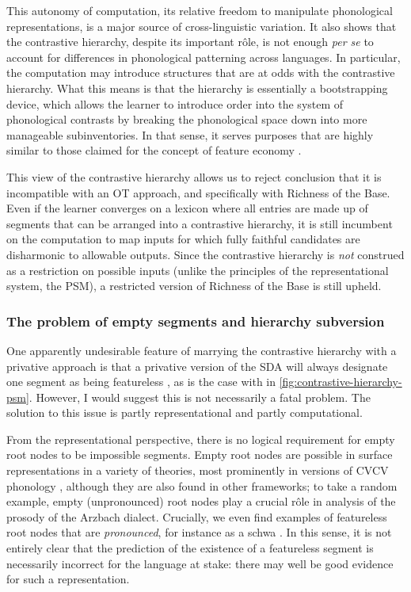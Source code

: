 This autonomy of computation, \ie its relative freedom to manipulate phonological representations, is a major source of cross\hyp linguistic variation. It also shows that the contrastive hierarchy, despite its important rôle, is not enough \emph{per se} to account for differences in phonological patterning across languages. In particular, the computation may introduce structures that are at odds with the contrastive hierarchy. What this means is that the hierarchy is essentially a bootstrapping device, which allows the learner to introduce order into the system of phonological contrasts by breaking the phonological space down into more manageable subinventories. In that sense, it serves purposes that are highly similar to those claimed for the concept of feature economy \citep[\egm][]{clements03:_featur}.

This view of the contrastive hierarchy allows us to reject  conclusion that it is incompatible with an OT approach, and specifically with Richness of the Base. Even if the learner converges on a lexicon where all entries are made up of segments that can be arranged into a contrastive hierarchy, it is still incumbent on the computation to map inputs for which fully faithful candidates are disharmonic to allowable outputs. Since the contrastive hierarchy is \emph{not} construed as a restriction on possible inputs (unlike the principles of the representational system, \ie the PSM), a restricted version of Richness of the Base is still upheld.

\subsubsection{The problem of empty segments and hierarchy subversion}
\label{sec:probl-empty-segm}

One apparently undesirable feature of marrying the contrastive hierarchy with a privative approach is that a privative version of the SDA will always designate one segment as being featureless \citep{currie07,blaho-diss}, as is the case with  in \cref{fig:contrastive-hierarchy-psm}. However, I would suggest this is not necessarily a fatal problem. The solution to this issue is partly representational and partly computational.

From the representational perspective, there is no logical requirement for empty root nodes to be impossible segments. Empty root nodes are possible in surface representations in a variety of theories, most prominently in versions of CVCV phonology \citep[\egm][]{scheer04}, although they are also found in other frameworks; to take a random example, empty (unpronounced) root nodes play a crucial rôle in  analysis of the prosody of the Arzbach dialect. Crucially, we even find examples of featureless root nodes that are \emph{pronounced}, for instance as a schwa \citep[\egm][]{oostendorp00:_phonol,nesset-reduction}. In this sense, it is not entirely clear that the prediction of the existence of a featureless segment is necessarily incorrect for the language at stake: there may well be good evidence for such a representation.

